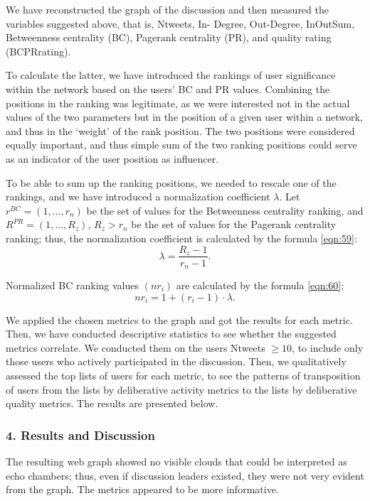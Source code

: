We have reconstructed the graph of the discussion and then measured the variables suggested above, that is, Ntweets, In- Degree, Out-Degree, InOutSum, Betweenness centrality (BC), Pagerank centrality (PR), and quality rating (BCPRrating).

To calculate the latter, we have introduced the rankings of user significance within the network based on the users’ BC and PR values. Combining the positions in the ranking was legitimate, as we were interested not in the actual values of the two parameters but in the position of a given user within a network, and thus in the ‘weight’ of the rank position. The two positions were considered equally important, and thus simple sum of the two ranking positions could serve as an indicator of the user position as influencer.

To be able to sum up the ranking positions, we needed to rescale one of the rankings, and we have introduced a normalization coefficient \(\lambda\). Let \(r^{BC} = (1,\ldots,r_n)\) be the set of values for the Betweenness centrality ranking, and \(R^{PR} = (1,\ldots,R_z)\), \(R_z > r_n\) be the set of values for the Pagerank centrality ranking; thus, the normalization coefficient is calculated by the formula \cref{eqn:59}:
\begin{equation}
	\label{eqn:59}
	\lambda = \frac{R_z - 1}{r_n - 1}.
\end{equation}

Normalized BC ranking values \((nr_i)\) are calculated by the formula \cref{eqn:60}:
\begin{equation}
	\label{eqn:60}
	nr_i = 1 + (r_i - 1) \cdot \lambda.
\end{equation}

We applied the chosen metrics to the graph and got the results for each metric. Then, we have conducted descriptive statistics to see whether the suggested metrics correlate. We conducted them on the users Ntweets \(\ge 10\), to include only those users who actively participated in the discussion. Then, we qualitatively assessed the top lists of users for each metric, to see the patterns of transposition of users from the lists by deliberative activity metrics to the lists by deliberative quality metrics. The results are presented below.

\subsubsection{4. Results and Discussion}
The resulting web graph showed no visible clouds that could be interpreted as echo chambers; thus, even if discussion leaders existed, they were not very evident from the graph. The metrics appeared to be more informative.

